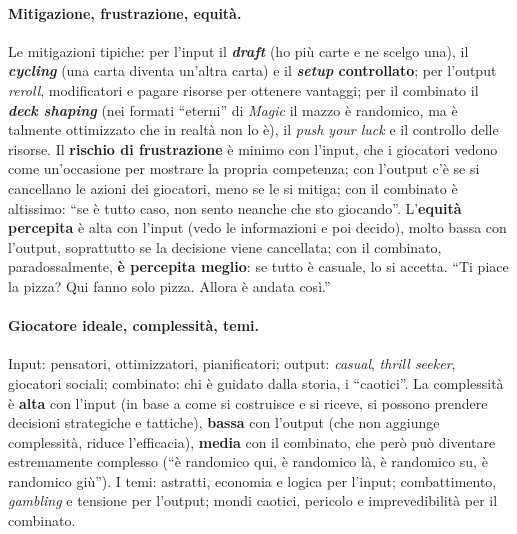 \paragraph{Mitigazione, frustrazione, equità.} Le mitigazioni tipiche: per l'input il
\textbf{\emph{draft}} (ho più carte e ne scelgo una), il \textbf{\emph{cycling}} (una carta
diventa un'altra carta) e il \textbf{\emph{setup} controllato}; per l'output \emph{reroll},
modificatori e pagare risorse per ottenere vantaggi; per il combinato il \textbf{\emph{deck
shaping}} (nei formati ``eterni'' di \emph{Magic} il mazzo è randomico, ma è talmente
ottimizzato che in realtà non lo è), il \emph{push your luck} e il controllo delle risorse.
Il \textbf{rischio di frustrazione} è minimo con l'input, che i giocatori vedono come
un'occasione per mostrare la propria competenza; con l'output c'è se si cancellano le azioni
dei giocatori, meno se le si mitiga; con il combinato è altissimo: ``se è tutto caso, non sento
neanche che sto giocando''. L'\textbf{equità percepita} è alta con l'input (vedo le
informazioni e poi decido), molto bassa con l'output, soprattutto se la decisione viene
cancellata; con il combinato, paradossalmente, \textbf{è percepita meglio}: se tutto è casuale,
lo si accetta. ``Ti piace la pizza? Qui fanno solo pizza. Allora è andata così.''

\paragraph{Giocatore ideale, complessità, temi.} Input: pensatori, ottimizzatori,
pianificatori; output: \emph{casual}, \emph{thrill seeker}, giocatori sociali; combinato: chi
è guidato dalla storia, i ``caotici''. La complessità è \textbf{alta} con l'input (in base a
come si costruisce e si riceve, si possono prendere decisioni strategiche e tattiche),
\textbf{bassa} con l'output (che non aggiunge complessità, riduce l'efficacia), \textbf{media}
con il combinato, che però può diventare estremamente complesso (``è randomico qui, è
randomico là, è randomico su, è randomico giù''). I temi: astratti, economia e logica per
l'input; combattimento, \emph{gambling} e tensione per l'output; mondi caotici, pericolo e
imprevedibilità per il combinato.

